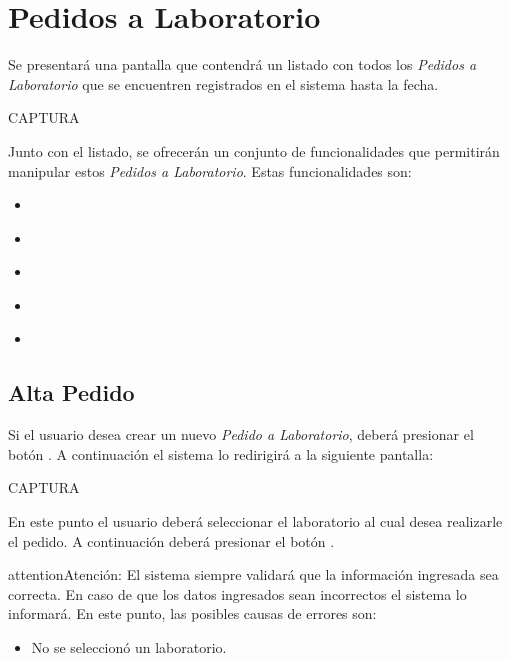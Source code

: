 \documentclass[a4paper,10pt,spanish]{sphinxmanual}
\begin{document}
\section{Pedidos a Laboratorio}
\label{pedidosalab:pedidos-a-laboratorio}\label{pedidosalab::doc}
Se presentará una pantalla que contendrá un listado con todos los \emph{Pedidos a Laboratorio} que se encuentren registrados en el sistema hasta la fecha.

CAPTURA

Junto con el listado, se ofrecerán un conjunto de funcionalidades que permitirán manipular estos \emph{Pedidos a Laboratorio}.
Estas funcionalidades son:
\begin{itemize}
\item {} 
{\hyperref[pedidosalab:alta\string-pl]{}}

\item {} 
{\hyperref[pedidosalab:cancelar\string-pedido\string-pl]{}}

\item {} 
{\hyperref[pedidosalab:ver\string-detalles\string-pl]{}}

\item {} 
{\hyperref[pedidosalab:ver\string-remitos\string-pl]{}}

\item {} 
{\hyperref[pedidosalab:formulario\string-busqueda\string-pl]{}}

\end{itemize}


\subsection{Alta Pedido}
\label{pedidosalab:alta-pl}\label{pedidosalab:alta-pedido}
Si el usuario desea crear un nuevo \emph{Pedido a Laboratorio}, deberá presionar el botón . A continuación el sistema lo redirigirá a la siguiente pantalla:

CAPTURA

En este punto el usuario deberá seleccionar el laboratorio al cual desea realizarle el pedido. A continuación deberá presionar el botón .

\begin{notice}{attention}{Atención:}
El sistema siempre validará que la información ingresada sea correcta. En caso de que los datos ingresados sean incorrectos el sistema lo informará.
En este punto, las posibles causas de errores son:
\begin{itemize}
\item {} 
No se seleccionó un laboratorio.

\end{itemize}
\end{notice}
\end{document}
